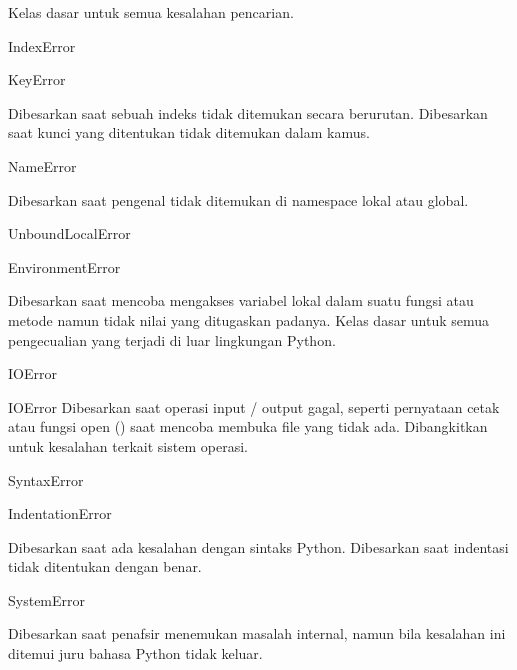 \noindent 
Kelas dasar untuk semua kesalahan pencarian. \par
\vspace{12pt}
\noindent 
IndexError \par
\noindent 
KeyError \hspace*{0.5in}  \hspace*{0.5in}  \par
\noindent 
Dibesarkan saat sebuah indeks tidak ditemukan secara berurutan. Dibesarkan saat kunci yang ditentukan tidak ditemukan dalam kamus. \par
\vspace{12pt}
\noindent 
NameError \hspace*{0.5in}  \hspace*{0.5in}  \par
\noindent 
Dibesarkan saat pengenal tidak ditemukan di namespace lokal atau global. \par
\vspace{12pt}
\noindent 
UnboundLocalError \par
\noindent 
EnvironmentError \hspace*{0.5in}  \par
\noindent 
Dibesarkan saat mencoba mengakses variabel lokal dalam suatu fungsi atau metode namun tidak nilai yang ditugaskan padanya. Kelas dasar untuk semua pengecualian yang terjadi di luar lingkungan Python. \par
\vspace{12pt}
\noindent 
IOError \par
\noindent 
IOError Dibesarkan saat operasi input / output gagal, seperti pernyataan cetak atau fungsi open () saat mencoba membuka file yang tidak ada. Dibangkitkan untuk kesalahan terkait sistem operasi. \par
\vspace{12pt}
\noindent 
SyntaxError  \par
\noindent 
IndentationError \hspace*{0.5in}  \par
\noindent 
Dibesarkan saat ada kesalahan dengan sintaks Python. Dibesarkan saat indentasi tidak ditentukan dengan benar. \par
\noindent 
SystemError \hspace*{0.5in}  \par
\noindent 
Dibesarkan saat penafsir menemukan masalah internal, namun bila kesalahan ini ditemui juru bahasa Python tidak keluar. \par
\vspace{12pt}
